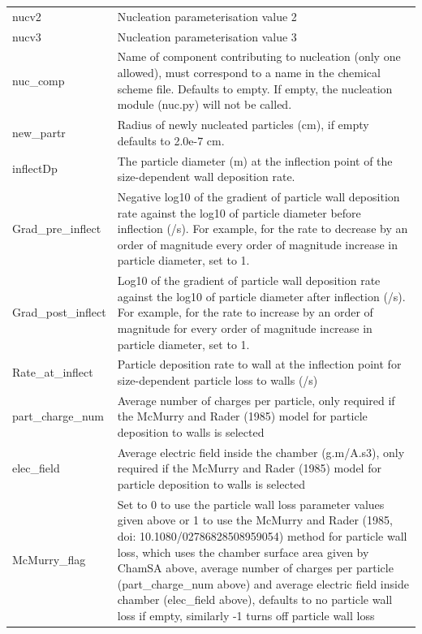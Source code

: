 \documentclass[gmd, manuscript]{copernicus}
\begin{document}
\begin{center}
\begin{supertabular}{p{0.15\textwidth}p{0.75\textwidth}}
nucv2 & Nucleation parameterisation value 2\\

nucv3 & Nucleation parameterisation value 3\\

nuc\_comp & Name of component contributing to nucleation (only one allowed), must correspond to a name in the chemical scheme file.  Defaults to empty.  If empty, the nucleation module (nuc.py) will not be called.\\

new\_partr & Radius of newly nucleated particles (cm), if empty defaults to 2.0e-7 cm.\\

inflectDp & The particle diameter (m) at the inflection point of the size-dependent wall deposition rate.\\

Grad\_pre\_inflect & Negative log10 of the gradient of particle wall deposition rate against the log10 of particle diameter before inflection (/s).  For example, for the rate to decrease by an order of magnitude every order of magnitude increase in particle diameter, set to 1.\\

Grad\_post\_inflect & Log10 of the gradient of particle wall deposition rate against the log10 of particle diameter after inflection (/s).  For example, for the rate to increase by an order of magnitude for every order of magnitude increase in particle diameter, set to 1.\\

Rate\_at\_inflect & Particle deposition rate to wall at the inflection point for size-dependent particle loss to walls (/s)\\

part\_charge\_num & Average number of charges per particle, only required if the McMurry and Rader (1985) model for particle deposition to walls is selected\\

elec\_field & Average electric field inside the chamber (g.m/A.s3), only required if the McMurry and Rader (1985) model for particle deposition to walls is selected\\

McMurry\_flag & Set to 0 to use the particle wall loss parameter values given above or 1 to use the McMurry and Rader (1985, doi: 10.1080/02786828508959054) method for particle wall loss, which uses the chamber surface area given by ChamSA above, average number of charges per particle (part\_charge\_num above) and average electric field inside chamber (elec\_field above), defaults to no particle wall loss if empty, similarly -1 turns off particle wall loss\\


\end{supertabular}
\end{center}
\end{document}
